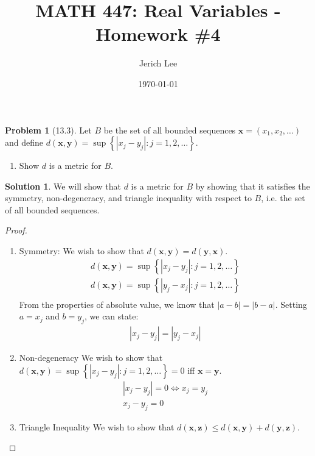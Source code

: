 \documentclass[12pt]{article}
\title{MATH 447: Real Variables - Homework \#4}
\author{Jerich Lee}
\date{\today}
\theoremstyle{definition} %
\newtheorem{solution}{Solution}
\newtheorem{problem}{Problem}
\theoremstyle{plain} %
\begin{document}
\maketitle

\begin{problem}[13.3]
Let $B$ be the set of all bounded sequences $\mathbf{x} = (x_{1}, x_{2}, \ldots)$ and define $d(\mathbf{x}, \mathbf{y})=\sup \left\{ \left\vert x_{j}-y_{j}  \right\vert :j=1,2, \ldots   \right\} $.
\begin{enumerate}
    \item Show $d$ is a metric for $B$. 
\end{enumerate}
\end{problem}

\begin{solution}
We will show that $d$ is a metric for $B$ by showing that it satisfies the symmetry, non-degeneracy, and triangle inequality with respect to $B$, i.e. the set of all bounded sequences.
\begin{proof}
 \begin{enumerate}
    \item Symmetry: 
    We wish to show that $d(\mathbf{x}, \mathbf{y})=d(\mathbf{y}, \mathbf{x})$.  \begin{align} d(\mathbf{x}, \mathbf{y}) = \sup\left\{ \left\vert x_{j}-y_{j} \right\vert : j=1,2, \ldots   \right\} \\[10pt]  d(\mathbf{x}, \mathbf{y}) = \sup\left\{ \left\vert y_{j}-x_{j} \right\vert : j=1,2, \ldots   \right\} \\[10pt] \end{align} From the properties of absolute value, we know that $\left\vert a-b \right\vert = \left\vert b-a \right\vert $. Setting $a=x_{j}$ and $b=y_{j} $, we can state: \begin{align} \left\vert x_{j} -y_{j}  \right\vert =\left\vert y_{j} -x_{j}  \right\vert \end{align} \item Non-degeneracy We wish to show that $d(\mathbf{x},\mathbf{y} )=\sup \left\{ \left\vert x_{j}-y_{j}  \right\vert : j=1,2, \ldots   \right\}=0 $ iff $\mathbf{x} =\mathbf{y} $.
   \begin{align}
    \left\vert x_{j} -y_{j}  \right\vert =0  \iff x_{j} =y_{j} \\[10pt] 
    x_{j} -y_{j} =0    
   \end{align}
   \item Triangle Inequality
   We wish to show that $d(\mathbf{x}, \mathbf{z})\leq d(\mathbf{x},\mathbf{y})+d(\mathbf{y}, \mathbf{z})$.

\end{enumerate}
\end{proof}
\end{solution}
\end{document}
